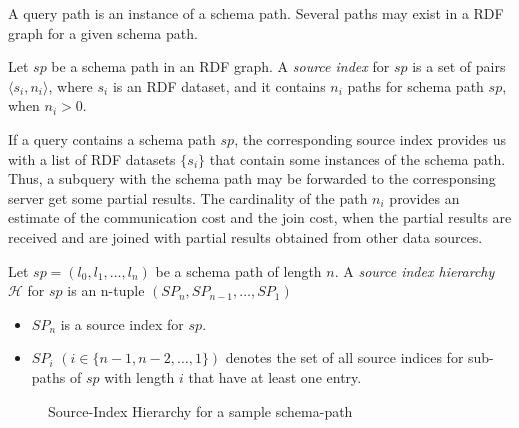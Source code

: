 \noindent
A query path is an instance of a schema path.  Several paths may exist in a RDF graph for a given schema path. 

\begin{definition} 
	Let $sp$ be a schema path in an RDF graph. A {\em source index} for $sp$ is a set of pairs $\langle s_i, n_i \rangle$, where 
	$s_i$ is an RDF dataset, and it contains $n_i$ paths for schema path $sp$, when $n_i > 0$.
\end{definition}

\noindent
If a query contains a schema path $sp$, the corresponding source index provides us with a list of RDF datasets $\{s_i\}$ that contain 
some instances of the schema path. Thus, a subquery with the schema path may be forwarded to the corresponsing server get some 
partial results. The cardinality of the path $n_i$ provides an estimate of the communication cost and the join cost, when the partial
results are received and are joined with partial results obtained from other data sources.

\begin{definition} 
	Let $sp =  (l_0, l_1, \dots, l_n)$ be a schema path of length $n$. A {\em source index hierarchy} $\mathcal{H}$ for $sp$ is 
	an n-tuple $(SP_n, SP_{n-1}, \dots, SP_1)$
	\begin{itemize}
		\item $SP_n$ is a source index for $sp$.
		\item $SP_i$ $(i \in \{n-1, n-2, \dots, 1\})$ denotes the set of all source indices for sub-paths of $sp$ with 
			length $i$ that have at least one entry.
	\end{itemize}
\end{definition}

\begin{figure}[!htpb]
	\centerline{
	}
	\caption{Source-Index Hierarchy for a sample schema-path}
	\label{fig:knowledge:si-hierarchy}
\end{figure}

